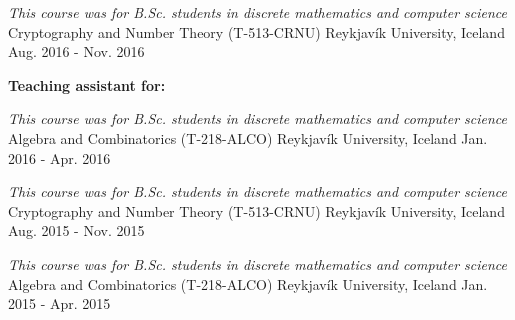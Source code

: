 \begin{cventries}

\cventrypresentation
  {\textit{This course was for B.Sc. students in discrete mathematics and computer science}} %
  {Cryptography and Number Theory (T-513-CRNU)} %
  {Reykjavík University, Iceland} %
  {Aug. 2016 - Nov. 2016} %


\begin{flushleft}
\textbf{Teaching assistant for:}
\end{flushleft}


\cventrypresentation
  {\textit{This course was for B.Sc. students in discrete mathematics and computer science}} %
  {Algebra and Combinatorics (T-218-ALCO)} %
  {Reykjavík University, Iceland} %
  {Jan. 2016 - Apr. 2016} %


\cventrypresentation
  {\textit{This course was for B.Sc. students in discrete mathematics and computer science}} %
  {Cryptography and Number Theory (T-513-CRNU)} %
  {Reykjavík University, Iceland} %
  {Aug. 2015 - Nov. 2015} %


\cventrypresentation
  {\textit{This course was for B.Sc. students in discrete mathematics and computer science}} %
  {Algebra and Combinatorics (T-218-ALCO)} %
  {Reykjavík University, Iceland} %
  {Jan. 2015 - Apr. 2015} %


\end{cventries}
